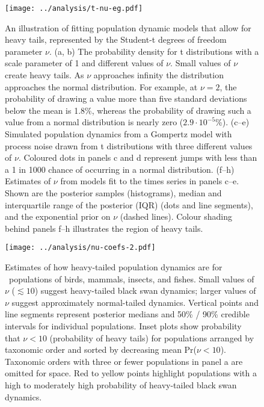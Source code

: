 \begin{figure}[htbp]
\begin{center}
\texttt{[image: ../analysis/t-nu-eg.pdf]}
\caption{
An illustration of fitting population dynamic models that allow for heavy tails, represented by the Student-t degrees of freedom parameter $\nu$. (a, b) The probability density for t distributions with a scale parameter of 1 and different values of $\nu$. Small values of $\nu$ create heavy tails. As $\nu$ approaches infinity the distribution approaches the normal distribution. For example, at $\nu = 2$, the probability of drawing a value more than five standard deviations below the mean is 1.8\%, whereas the probability of drawing such a value from a normal distribution is nearly zero ($2.9\cdot10^{-5}$\%). (c--e) Simulated population dynamics from a Gompertz model with process noise drawn from t distributions with three different values of $\nu$. Coloured dots in panels c and d represent jumps with less than a 1 in 1000 chance of occurring in a normal distribution. (f--h) Estimates of $\nu$ from models fit to the times series in panels c--e. Shown are the posterior samples (histograms), median and interquartile range of the posterior (IQR) (dots and line segments), and the exponential prior on $\nu$ (dashed lines). Colour shading behind panels f--h illustrates the region of heavy tails.
}
\label{fig:didactic}
\end{center}
\end{figure}

\clearpage

\begin{figure}[htbp]
\begin{center}
\texttt{[image: ../analysis/nu-coefs-2.pdf]}
\caption{
Estimates of how heavy-tailed population dynamics are for \nuCoefPopN\ populations of birds, mammals, insects, and fishes. Small values of $\nu$ ($\lesssim 10$) suggest heavy-tailed black swan dynamics; larger values of $\nu$ suggest approximately normal-tailed dynamics. Vertical points and line segments represent posterior medians and 50\% / 90\% credible intervals for individual populations. Inset plots show probability that $\nu < 10$ (probability of heavy tails) for populations arranged by taxonomic order and sorted by decreasing mean Pr($\nu < 10$). Taxonomic orders with three or fewer populations in panel a are omitted for space. Red to yellow points highlight populations with a high to moderately high probability of heavy-tailed black swan dynamics.
}
\label{fig:nu-coefs}
\end{center}
\end{figure}
\clearpage

